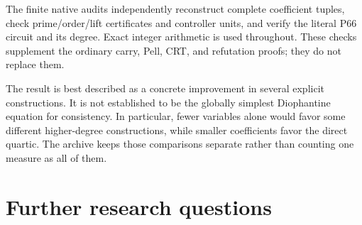 \documentclass[11pt,letterpaper]{article}
\theoremstyle{remark}\newtheorem{remark}[theorem]{Remark}
\begin{document}
The finite native audits independently reconstruct complete coefficient
tuples, check prime/order/lift certificates and controller units, and
verify the literal P66 circuit and its degree. Exact integer arithmetic
is used throughout. These checks supplement the ordinary carry,
Pell, CRT, and refutation proofs; they do not replace them.



The result is best described as a concrete improvement in several
explicit constructions. It is not established to be the globally
simplest Diophantine equation for consistency. In particular, fewer
variables alone would favor some different higher-degree constructions,
while smaller coefficients favor the direct quartic. The archive keeps
those comparisons separate rather than counting one measure as all of
them.

\section{Further research questions}
\end{document}

